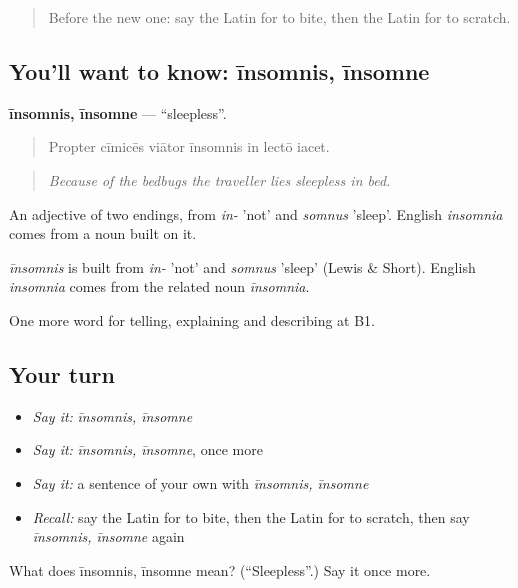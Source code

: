 \begin{quote}
Before the new one: say the Latin for to bite, then the Latin for to scratch.
\end{quote}

\subsection*{You'll want to know: īnsomnis, īnsomne}
\textbf{īnsomnis, īnsomne} — \textquotedblleft{}sleepless\textquotedblright{}.

\begin{quote}
Propter cīmicēs viātor īnsomnis in lectō iacet.
\end{quote}

\begin{quote}
\emph{Because of the bedbugs the traveller lies sleepless in bed.}
\end{quote}

An adjective of two endings, from \emph{in-} 'not' and \emph{somnus} 'sleep'. English \emph{insomnia} comes from a noun built on it.

\begin{cousinweb}
\emph{īnsomnis} is built from \emph{in-} 'not' and \emph{somnus} 'sleep' (Lewis \& Short). English \emph{insomnia} comes from the related noun \emph{īnsomnia}.
\end{cousinweb}

\begin{grammarlens}[title={What you've built}]
One more word for telling, explaining and describing at B1.
\end{grammarlens}

\subsection*{Your turn}
\begin{itemize}
\raggedright
  \item \emph{Say it:} \emph{īnsomnis, īnsomne}
  \item \emph{Say it:} \emph{īnsomnis, īnsomne}, once more
  \item \emph{Say it:} a sentence of your own with \emph{īnsomnis, īnsomne}
  \item \emph{Recall:} say the Latin for to bite, then the Latin for to scratch, then say \emph{īnsomnis, īnsomne} again
\end{itemize}

\begin{tcolorbox}[breakable,colback=teal!4,colframe=teal!35!black,title={Before you move on}]
What does īnsomnis, īnsomne mean? (\textquotedblleft{}Sleepless\textquotedblright{}.) Say it once more.
\end{tcolorbox}
